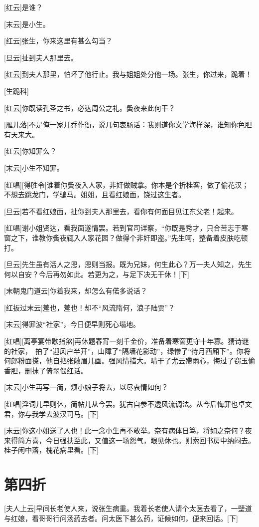 \documentclass{book}
\newcommand\nchapter[1]{\chapter*{#1}\markboth{#1}{}\addcontentsline{toc}{chapter}{#1}}
\begin{document}
[红云]是谁？

[末云]是小生。

[红云]张生，你来这里有甚么勾当？

[旦云]扯到夫人那里去。

[红云]到夫人那里，怕坏了他行止。我与姐姐处分他一场。张生，你过来，跪着！

[生跪科]

[红云]你既读孔圣之书，必达周公之礼。夤夜来此何干？

[雁儿落]不是俺一家儿乔作衙，说几句衷肠话：我则道你文学海样深，谁知你色胆有天来大。

[红云]你知罪么？

[末云]小生不知罪。

[红唱][得胜令]谁着你夤夜入人家，非奸做贼拿。你本是个折桂客，做了偷花汉；不想去跳龙门，学骗马。姐姐，且看红娘面，饶过这生者。

[旦云]若不看红娘面，扯你到夫人那里去，看你有何面目见江东父老！起来。

[红唱]谢小姐贤达，看我面遂情罢。若到官司详察，``你既是秀才，只合苦志于寒窗之下，谁教你夤夜辄入人家花园？做得个非奸即盗。''先生呵，整备着皮肤吃顿打。

[旦云]先生虽有活人之恩，恩则当报。既为兄妹，何生此心？万一夫人知之，先生何以自安？今后再勿如此。若更为之，与足下决无干休！[下]

[末朝鬼门道云]你着我来，却怎么有偌多说话？

[红扳过末云]羞也，羞也！却不``风流隋何，浪子陆贾''？

[末云]得罪波``社家''，今日便早则死心塌地。

[红唱][离亭宴带歇指煞]再休题春宵一刻千金价，准备着寒窗更守十年寡。猜诗谜的社家，　拍了``迎风户半开''，山障了``隔墙花影动''，绿惨了``待月西厢下''。你将何郎粉面搽，他自把张敞眉儿画。强风情措大。晴干了尤云殢雨心，悔过了窃玉偷香胆，删抹了倚翠偎红话。

[末云]小生再写一简，烦小娘子将去，以尽衷情如何？

[红唱]淫词儿早则休，简帖儿从今罢。犹古自参不透风流调法。从今后悔罪也卓文君，你与我学去波汉司马。[下]

[末云]你这小姐送了人也！此一念小生再不敢举。奈有病体日笃，将如之奈何？夜来得简方喜，今日强扶至此，又值这一场怨气，眼见休也。则索回书房中纳闷去。桂子闲中落，槐花病里看。[下]

\nchapter{第四折}

[夫人上云]早间长老使人来，说张生病重。我着长老使人请个太医去看了，一壁道与红娘，看哥哥行问汤药去者。问太医下甚么药，证候如何，便来回话。[下]
\end{document}

